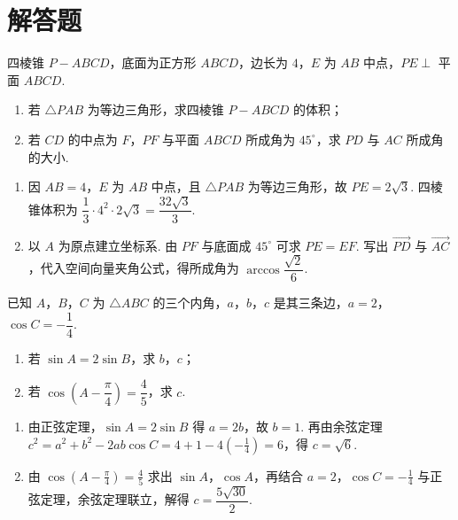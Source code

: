\section{解答题}

\begin{problem}
四棱锥 \(P-ABCD\)，底面为正方形 \(ABCD\)，边长为 \(4\)，\(E\) 为 \(AB\) 中点，\(PE\perp\) 平面 \(ABCD\).
\begin{enumerate}
\item 若 \(\triangle PAB\) 为等边三角形，求四棱锥 \(P-ABCD\) 的体积；
\item 若 \(CD\) 的中点为 \(F\)，\(PF\) 与平面 \(ABCD\) 所成角为 \(45^\circ\)，求 \(PD\) 与 \(AC\) 所成角的大小.
\end{enumerate}
\end{problem}

\begin{solution}
\begin{enumerate}
\item 因 \(AB=4\)，\(E\) 为 \(AB\) 中点，且 \(\triangle PAB\) 为等边三角形，故 \(PE=2\sqrt3\). 四棱锥体积为 \(\dfrac13\cdot4^2\cdot2\sqrt3=\dfrac{32\sqrt3}{3}\).
\item 以 \(A\) 为原点建立坐标系. 由 \(PF\) 与底面成 \(45^\circ\) 可求 \(PE=EF\). 写出 \(\overrightarrow{PD}\) 与 \(\overrightarrow{AC}\)，代入空间向量夹角公式，得所成角为 \(\arccos\dfrac{\sqrt2}{6}\).
\end{enumerate}
\end{solution}

\begin{problem}
已知 \(A\)，\(B\)，\(C\) 为 \(\triangle ABC\) 的三个内角，\(a\)，\(b\)，\(c\) 是其三条边，\(a=2\)，\(\cos C=-\dfrac14\).
\begin{enumerate}
\item 若 \(\sin A=2\sin B\)，求 \(b\)，\(c\)；
\item 若 \(\cos\left(A-\dfrac{\pi}{4}\right)=\dfrac45\)，求 \(c\).
\end{enumerate}
\end{problem}

\begin{solution}
\begin{enumerate}
\item 由正弦定理，\(\sin A=2\sin B\) 得 \(a=2b\)，故 \(b=1\). 再由余弦定理 \(c^2=a^2+b^2-2ab\cos C=4+1-4(-\frac14)=6\)，得 \(c=\sqrt6\).
\item 由 \(\cos(A-\frac{\pi}{4})=\frac45\) 求出 \(\sin A\)，\(\cos A\)，再结合 \(a=2\)，\(\cos C=-\frac14\) 与正弦定理，余弦定理联立，解得 \(c=\dfrac{5\sqrt{30}}2\).
\end{enumerate}
\end{solution}

